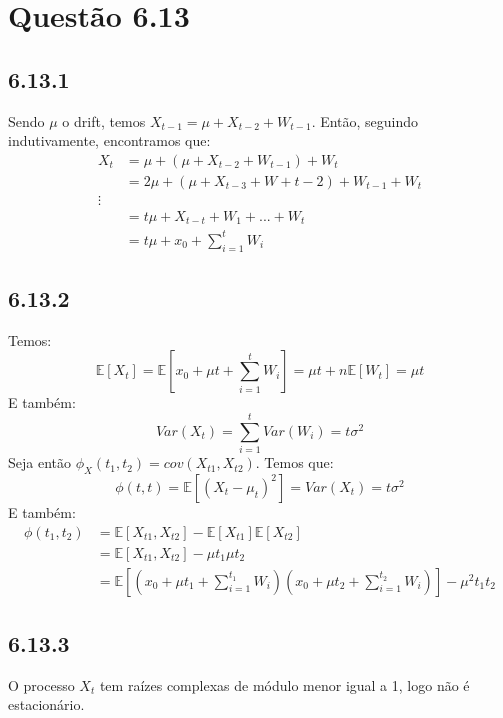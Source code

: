 \documentclass[12pt]{article}
\begin{document}
\section*{Questão 6.13}

\subsection*{6.13.1}
Sendo $\mu$ o drift, temos $X_{t-1}=\mu +X_{t-2}+W_{t-1}$. Então, seguindo indutivamente, encontramos que:
\begin{align*}
X_{t}&=\mu+(\mu+X_{t-2}+W_{t-1})+W_{t}\\
&=2\mu+(\mu + X_{t-3}+W+t-2)+W_{t-1}+W_{t}\\
\vdots\\
&=t\mu+X_{t-t}+W_{1}+...+W_{t}\\
&=t\mu +x_{0}+\sum_{i=1}^{t}W_{i}
\end{align*}

\subsection*{6.13.2}
Temos:
\begin{equation*}
\mathbb{E}[X_{t}]=\mathbb{E}[x_{0}+\mu t + \sum_{i=1}^{t}W_{i}] =
\mu t+n\mathbb{E}[W_{t}]=\mu t
\end{equation*}
E também:
\begin{equation*}
Var(X_{t})=\sum_{i=1}^{t}Var(W_{i})=t\sigma^2
\end{equation*}
Seja então $\phi_{X}(t_{1},t_{2})=cov(X_{t1},X_{t2})$. Temos que:
\begin{equation*}
\phi(t,t)=\mathbb{E}[(X_{t}-\mu_t)^2]=Var(X_{t})=t\sigma^2
\end{equation*}
E também:
\begin{align*}
\phi(t_{1},t_{2})&=\mathbb{E}[X_{t1}, X_{t2}]-\mathbb{E}[X_{t1}]\mathbb{E}[X_{t2}]\\
&=\mathbb{E}[X_{t1}, X_{t2}]-\mu t_{1}\mu t_{2}\\
&=\mathbb{E}\left[\left(x_{0}+\mu t_{1} + \sum_{i=1}^{t_1}W_{i}\right)\left(x_{0}+\mu t_{2} + \sum_{i=1}^{t_{2}}W_{i}\right)\right]-\mu^2t_{1}t_{2}
\end{align*}

\subsection*{6.13.3}
O processo $X_{t}$ tem raízes complexas de módulo menor igual a 1, logo não é estacionário.
\end{document}
